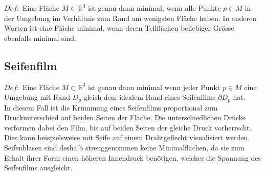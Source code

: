 \begin{refsection}
$Def:$ Eine Fläche $M\subset\mathbb{R}^{3}$ ist genau dann minimal, wenn alle Punkte $ p \in M $ in der Umgebung  im Verhältnis zum Rand am wenigsten Fläche haben.
In anderen Worten ist eine Fläche minimal, wenn deren Teilflächen beliebiger Grösse ebenfalls minimal sind.  

\subsection{Seifenfilm}\label{Seifenfilm}
$Def:$ Eine Fläche $M\subset\mathbb{R}^{3}$ ist genau dann minimal wenn jeder Punkt $p \in M$ eine Umgebung mit Rand $D_p$ gleich dem idealem Rand eines Seifenfilms $\partial D_p$ hat.\\
In diesem Fall ist die Krümmung eines Seifenfilms proportional zum Druckunterschied auf beiden Seiten der Fläche. Die unterschiedlichen Drücke verformen dabei den Film, bis auf beiden Seiten der gleiche Druck vorherrscht. Dies kann beispielsweise mit Seife auf einem Drahtgeflecht visualisiert werden. Seifenblasen sind deshalb strenggenommen keine Minimalflächen, da sie zum Erhalt ihrer Form einen höheren Innendruck benötigen, welcher die Spannung des Seifenfilms ausgleicht.





\printbibliography[heading=subbibliography]
\end{refsection}